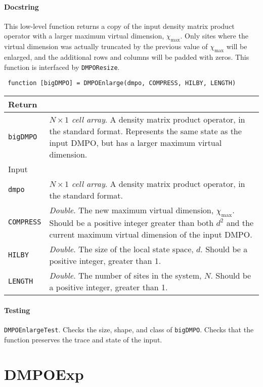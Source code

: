  \paragraph{Docstring} This low-level function returns a copy of the input density matrix product operator with a larger maximum virtual dimension, \(\chi_{\mathrm{max}}\). Only sites where the virtual dimension was actually truncated by the previous value of \(\chi_{\mathrm{max}}\) will be enlarged, and the additional rows and columns will be padded with zeros. This function is interfaced by \lstinline$DMPOResize$.
 \begin{lstlisting}
 function [bigDMPO] = DMPOEnlarge(dmpo, COMPRESS, HILBY, LENGTH) \end{lstlisting}
 \begin{longtabu}{X[1,1]X[4,1]}
 \hline
 Return & \\ \hline
 \lstinline$bigDMPO$ & \emph{\(N \times 1\) cell array}. A density matrix product operator, in the standard format. Represents the same state as the input DMPO, but has a larger maximum virtual dimension. \\ \hline
 Input & \\ \hline
 \lstinline$dmpo$ & \emph{\(N \times 1\) cell array}. A density matrix product operator, in the standard format. \\
 \lstinline$COMPRESS$ & \emph{Double}. The new maximum virtual dimension, \(\chi_{\mathrm{max}}\). Should be a positive integer greater than both \(d^{2}\) and the current maximum virtual dimension of the input DMPO. \\
 \lstinline$HILBY$ & \emph{Double}. The size of the local state space, \(d\). Should be a positive integer, greater than 1. \\
 \lstinline$LENGTH$ & \emph{Double}. The number of sites in the system, \(N\). Should be a positive integer, greater than 1. \\
 \hline
 \end{longtabu}
 \paragraph{Testing} \lstinline$DMPOEnlargeTest$. Checks the size, shape, and class of \lstinline$bigDMPO$. Checks that the function preserves the trace and state of the input.

 \section{DMPOExp}
